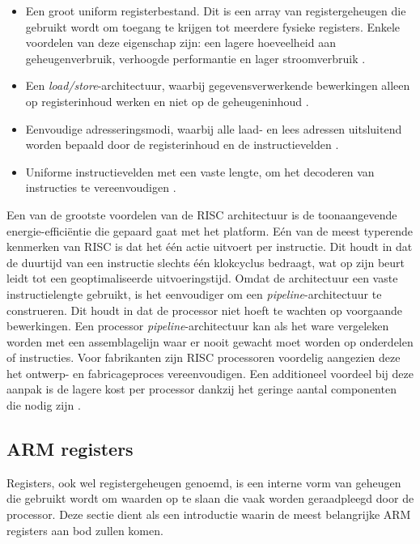 \begin{itemize}
    \item Een groot uniform registerbestand. Dit is een array van registergeheugen die gebruikt wordt om toegang te krijgen tot meerdere fysieke registers. Enkele voordelen van deze eigenschap zijn: een lagere hoeveelheid aan geheugenverbruik, verhoogde performantie en lager stroomverbruik \autocite{Postiff2000}.
    \item Een \textit{load/store}-architectuur, waarbij gegevensverwerkende bewerkingen alleen op registerinhoud werken en niet op de geheugeninhoud \autocite{ARM2022a}.
    \item Eenvoudige adresseringsmodi, waarbij alle laad- en lees adressen uitsluitend worden bepaald door de registerinhoud en de instructievelden \autocite{Seal2000}.
    \item Uniforme instructievelden met een vaste lengte, om het decoderen van instructies te vereenvoudigen \autocite{ARM2022a}. 
\end{itemize}

Een van de grootste voordelen van de RISC architectuur is de toonaangevende energie-efficiëntie die gepaard gaat met het platform. Eén van de meest typerende kenmerken van RISC is dat het één actie uitvoert per instructie. Dit houdt in dat de duurtijd van een instructie slechts één klokcyclus bedraagt, wat op zijn beurt leidt tot een geoptimaliseerde uitvoeringstijd. Omdat de architectuur een vaste instructielengte gebruikt, is het eenvoudiger om een \textit{pipeline}-architectuur te construeren. Dit houdt in dat de processor niet hoeft te wachten op voorgaande bewerkingen. Een processor \textit{pipeline}-architectuur kan als het ware vergeleken worden met een assemblagelijn waar er nooit gewacht moet worden op onderdelen of instructies. Voor fabrikanten zijn RISC processoren voordelig aangezien deze het ontwerp- en fabricageproces vereenvoudigen. Een additioneel voordeel bij deze aanpak is de lagere kost per processor dankzij het geringe aantal componenten die nodig zijn \autocite{ARM2022}.

\subsection{ARM registers}
Registers, ook wel registergeheugen genoemd, is een interne vorm van geheugen die gebruikt wordt om waarden op te slaan die vaak worden geraadpleegd door de processor. Deze sectie dient als een introductie waarin de meest belangrijke ARM registers aan bod zullen komen.

